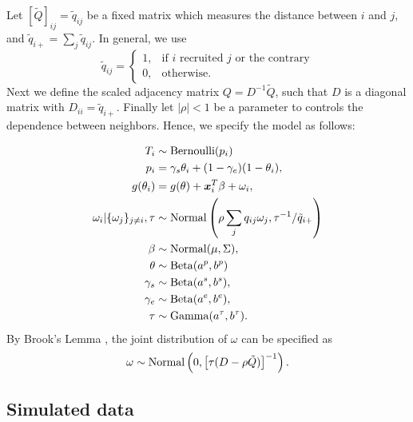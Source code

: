 Let $[\tilde{Q}]_{ij} = \tilde{q}_{ij}$ be a fixed matrix which measures the distance between $i$
and $j$, and $\tilde{q}_{i+} = \sum_{j} \tilde{q}_{ij}$. In general, we use
$$
\tilde{q}_{ij} = \begin{cases}
  1, &\text{if } i \text{ recruited } j \text{ or the contrary} \\
  0, &\text{otherwise.} 
\end{cases}
$$
Next we define the scaled adjacency matrix $Q = D^{-1}\tilde{Q}$, such that $D$
is a diagonal matrix with $D_{ii} = \tilde{q}_{i+}$. Finally let $|\rho| < 1$ be a
parameter to controls the dependence between neighbors. Hence, we specify the
model as follows:

\begin{equation}
  \begin{aligned}
    T_i &\sim \operatorname{Bernoulli}(p_i) \\
    p_i &= \gamma_s\theta_i + (1-\gamma_e)(1 - \theta_i),  \\
    g(\theta_i) &= g(\theta) + \boldsymbol{x}_i^T\beta + \omega_i,  \\
    \omega_i|\{\omega_j\}_{j\neq i}, \tau &\sim \operatorname{Normal}\left(\rho\sum_j q_{ij}\omega_j, \tau^{-1}/\tilde{q}_{i+}\right) \\
    \beta &\sim \operatorname{Normal}(\mu, \Sigma), \\ 
    \theta &\sim \operatorname{Beta}(a^p, b^p) \\
    \gamma_s &\sim \operatorname{Beta}(a^s, b^s), \\
    \gamma_e &\sim \operatorname{Beta}(a^e, b^e), \\  
    \tau &\sim \operatorname{Gamma}(a^{\tau}, b^{\tau}).
  \end{aligned}  
\end{equation}
By Brook's Lemma \cite[]{brook1964distinction}, the joint distribution of
$\omega$ can be specified as 
$$
\omega \sim \operatorname{Normal}\left(0, \left[\tau (D - \rho \tilde{Q})\right]^{-1}\right).
$$

\subsection{Simulated data}

